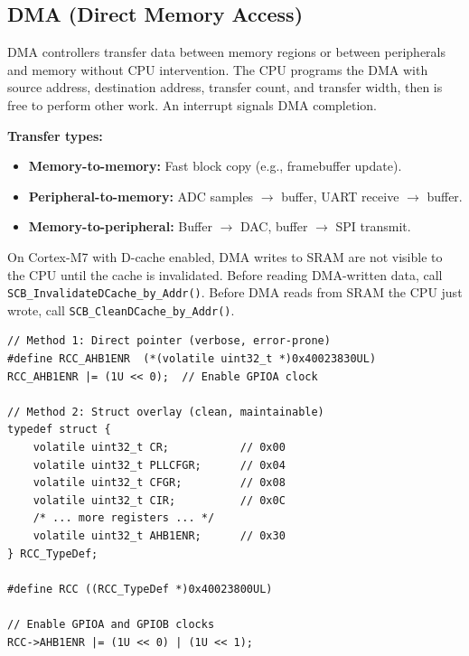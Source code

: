 \subsection{DMA (Direct Memory Access)}

DMA controllers transfer data between memory regions or between peripherals and memory without CPU intervention. The CPU programs the DMA with source address, destination address, transfer count, and transfer width, then is free to perform other work. An interrupt signals DMA completion.

\textbf{Transfer types:}
\begin{itemize}[nosep]
  \item \textbf{Memory-to-memory:} Fast block copy (e.g., framebuffer update).
  \item \textbf{Peripheral-to-memory:} ADC samples $\to$ buffer, UART receive $\to$ buffer.
  \item \textbf{Memory-to-peripheral:} Buffer $\to$ DAC, buffer $\to$ SPI transmit.
\end{itemize}

\begin{practicalNote}
On Cortex-M7 with D-cache enabled, DMA writes to SRAM are not visible to the CPU until the cache is invalidated. Before reading DMA-written data, call \texttt{SCB\_InvalidateDCache\_by\_Addr()}. Before DMA reads from SRAM the CPU just wrote, call \texttt{SCB\_CleanDCache\_by\_Addr()}.
\end{practicalNote}

\begin{lstlisting}[style=C, caption={Accessing memory-mapped registers: direct pointer vs. struct overlay.}]
// Method 1: Direct pointer (verbose, error-prone)
#define RCC_AHB1ENR  (*(volatile uint32_t *)0x40023830UL)
RCC_AHB1ENR |= (1U << 0);  // Enable GPIOA clock

// Method 2: Struct overlay (clean, maintainable)
typedef struct {
    volatile uint32_t CR;           // 0x00
    volatile uint32_t PLLCFGR;      // 0x04
    volatile uint32_t CFGR;         // 0x08
    volatile uint32_t CIR;          // 0x0C
    /* ... more registers ... */
    volatile uint32_t AHB1ENR;      // 0x30
} RCC_TypeDef;

#define RCC ((RCC_TypeDef *)0x40023800UL)

// Enable GPIOA and GPIOB clocks
RCC->AHB1ENR |= (1U << 0) | (1U << 1);
\end{lstlisting}

